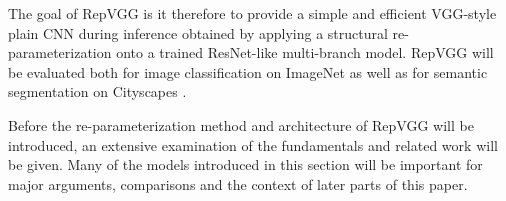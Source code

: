 The goal of RepVGG is it therefore to provide a simple and efficient VGG-style plain CNN during inference obtained by applying a structural re-parameterization onto a trained ResNet-like multi-branch model. RepVGG will be evaluated both for image classification on ImageNet \cite{JiaDeng.2009} as well as for semantic segmentation on Cityscapes \cite{MariusCordts.2016}. 

Before the re-parameterization method and architecture of RepVGG will be introduced, an extensive examination of the fundamentals and related work will be given. Many of the models introduced in this section will be important for major arguments, comparisons and the context of later parts of this paper. 